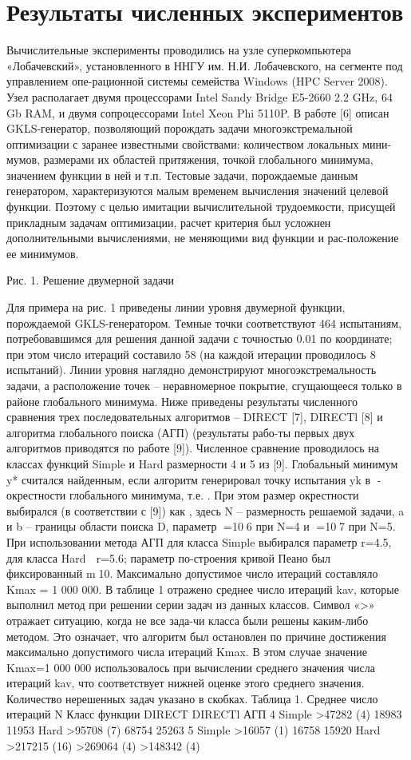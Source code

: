 \section{Результаты численных экспериментов}
Вычислительные эксперименты проводились на узле суперкомпьютера «Лобачевский», установленного в ННГУ им. Н.И. Лобачевского, на сегменте под управлением опе-рационной системы семейства Windows (HPC Server 2008). Узел располагает двумя процессорами Intel Sandy Bridge E5-2660 2.2 GHz, 64 Gb RAM, и двумя сопроцессорами Intel Xeon Phi 5110P. 
В работе [6] описан GKLS-генератор, позволяющий порождать задачи многоэкстремальной оптимизации с заранее известными свойствами: количеством локальных мини-мумов, размерами их областей притяжения, точкой глобального минимума, значением функции в ней и т.п. Тестовые задачи, порождаемые данным генератором, характеризуются малым временем вычисления значений целевой функции. Поэтому с целью имитации вычислительной трудоемкости, присущей прикладным задачам оптимизации, расчет критерия был усложнен дополнительными вычислениями, не меняющими вид функции и рас-положение ее минимумов.

 
Рис. 1. Решение двумерной задачи

Для примера на рис. 1 приведены линии уровня двумерной функции, порождаемой GKLS-генератором. Темные точки соответствуют 464 испытаниям, потребовавшимся для решения данной задачи с точностью 0.01 по координате; при этом число итераций составило 58 (на каждой итерации проводилось 8 испытаний). Линии уровня наглядно демонстрируют многоэкстремальность задачи, а расположение точек – неравномерное покрытие, сгущающееся только в районе глобального минимума.
Ниже приведены результаты численного сравнения трех последовательных алгоритмов – DIRECT [7], DIRECTl [8] и алгоритма глобального поиска (АГП) (результаты рабо-ты первых двух алгоритмов приводятся по работе [9]). Численное сравнение проводилось на классах функций Simple и Hard размерности 4 и 5 из [9]. Глобальный минимум y* считался найденным, если алгоритм генерировал точку испытания yk в -окрестности глобального минимума, т.е.  . При этом размер окрестности выбирался (в соответствии с [9]) как  , здесь N – размерность решаемой задачи, a и b – границы области поиска D, параметр =106 при N=4 и =107 при N=5. При использовании метода АГП для класса Simple выбирался параметр r=4.5, для класса Hard  r=5.6; параметр по-строения кривой Пеано был фиксированный m10. Максимально допустимое число итераций составляло Kmax = 1 000 000. 
В таблице 1 отражено среднее число итераций kav, которые выполнил метод при решении серии задач из данных классов. Символ «>» отражает ситуацию, когда не все зада-чи класса были решены каким-либо методом. Это означает, что алгоритм был остановлен по причине достижения максимально допустимого числа итераций Kmax. В этом случае значение Kmax=1 000 000 использовалось при вычислении среднего значения числа итераций kav, что соответствует нижней оценке этого среднего значения. Количество нерешенных задач указано в скобках.
Таблица 1. Среднее число итераций
N	Класс функции	DIRECT	DIRECTl	АГП
4	Simple	>47282 (4)	18983	11953
	Hard	>95708 (7)	68754	25263
5	Simple	>16057 (1)	16758	15920
	Hard	>217215 (16)	>269064 (4)	>148342 (4)

